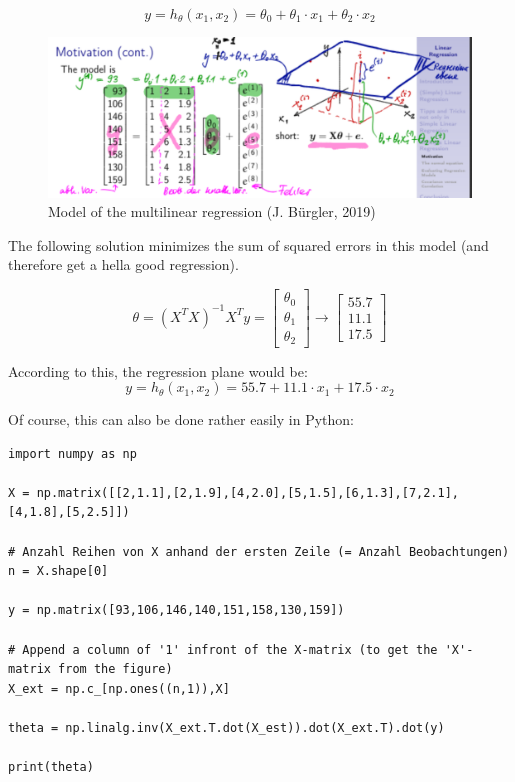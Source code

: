 \documentclass[a4paper, 11pt]{article}
\begin{document}
\vspace{10px}

\begin{equation*}
	y = h_\theta (x_1, x_2) = \theta_0 + \theta_1 \cdot x_1 + \theta_2 \cdot x_2
\end{equation*}
    
\begin{figure}[htb!]
    \centering
    \includegraphics[keepaspectratio=true, width=\linewidth]{multilinear_regression.png}
    \caption{Model of the multilinear regression (\textcopyright J. Bürgler, 2019)}
    \label{multilinear_regression}
\end{figure}

The following solution  minimizes the sum of squared errors in this model (and therefore get a hella good regression).

\begin{equation*}
	\theta = (X^T X)^{-1} X^T y = 
        \begin{bmatrix}
            \theta_0 \\
            \theta_1 \\
            \theta_2
        \end{bmatrix}  
        \rightarrow
        \begin{bmatrix}
            55.7 \\
            11.1 \\
            17.5 
        \end{bmatrix}  
\end{equation*}

According to this, the regression plane would be:
\begin{equation*}
	y = h_\theta (x_1, x_2) = 55.7 + 11.1 \cdot x_1 + 17.5 \cdot x_2
\end{equation*}

\newpage

Of course, this can also be done rather easily in Python:

\begin{lstlisting}
import numpy as np

X = np.matrix([[2,1.1],[2,1.9],[4,2.0],[5,1.5],[6,1.3],[7,2.1],[4,1.8],[5,2.5]])

# Anzahl Reihen von X anhand der ersten Zeile (= Anzahl Beobachtungen)
n = X.shape[0]

y = np.matrix([93,106,146,140,151,158,130,159])

# Append a column of '1' infront of the X-matrix (to get the 'X'-matrix from the figure) 
X_ext = np.c_[np.ones((n,1)),X]

theta = np.linalg.inv(X_ext.T.dot(X_est)).dot(X_ext.T).dot(y)

print(theta)
\end{lstlisting}
\end{document}
